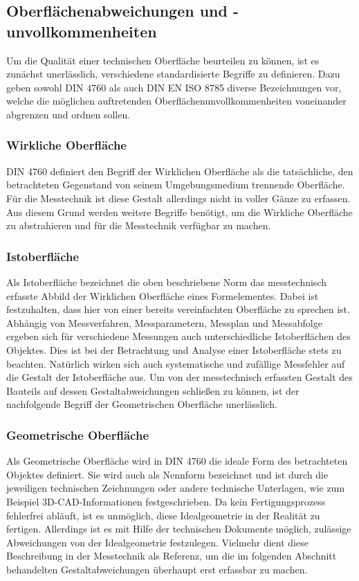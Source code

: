 \subsection{Oberflächenabweichungen und -unvollkommenheiten}

Um die Qualität einer technischen Oberfläche beurteilen zu können, ist es zunächst unerlässlich, verschiedene standardisierte Begriffe zu definieren. Dazu geben sowohl DIN 4760 als auch DIN EN ISO 8785 diverse Bezeichnungen vor, welche die möglichen auftretenden Oberflächenunvollkommenheiten voneinander abgrenzen und ordnen sollen.

\subsubsection{Wirkliche Oberfläche}

DIN 4760 definiert den Begriff der Wirklichen Oberfläche als die tatsächliche, den betrachteten Gegenstand von seinem Umgebungsmedium trennende Oberfläche. Für die Messtechnik ist diese Gestalt allerdings nicht in voller Gänze zu erfassen. Aus diesem Grund werden weitere Begriffe benötigt, um die Wirkliche Oberfläche zu abstrahieren und für die Messtechnik verfügbar zu machen. 

\subsubsection{Istoberfläche}

Als Istoberfläche bezeichnet die oben beschriebene Norm das messtechnisch erfasste Abbild der Wirklichen Oberfläche eines Formelementes. Dabei ist festzuhalten, dass hier von einer bereits vereinfachten Oberfläche zu sprechen ist. Abhängig von Messverfahren, Messparametern, Messplan und Messabfolge ergeben sich für verschiedene Messungen auch unterschiedliche Istoberflächen des Objektes. Dies ist bei der Betrachtung und Analyse einer Istoberfläche stets zu beachten. Natürlich wirken sich auch systematische und zufällige Messfehler auf die Gestalt der Istoberfläche aus. Um von der messtechnisch erfassten Gestalt des Bauteils auf dessen Gestaltabweichungen schließen zu können, ist der nachfolgende Begriff der Geometrischen Oberfläche unerlässlich. 

\subsubsection{Geometrische Oberfläche}

Als Geometrische Oberfläche wird in DIN 4760 die ideale Form des betrachteten Objektes definiert. Sie wird auch als Nennform bezeichnet und ist durch die jeweiligen technischen Zeichnungen oder andere technische Unterlagen, wie zum Beispiel 3D-CAD-Informationen festgeschrieben. Da kein Fertigungsprozess fehlerfrei abläuft, ist es unmöglich, diese Idealgeometrie in der Realität zu fertigen. Allerdings ist es mit Hilfe der technischen Dokumente möglich, zulässige Abweichungen von der Idealgeometrie festzulegen. Vielmehr dient diese Beschreibung in der Messtechnik als Referenz, um die im folgenden Abschnitt behandelten Gestaltabweichungen überhaupt erst erfassbar zu machen.
     
